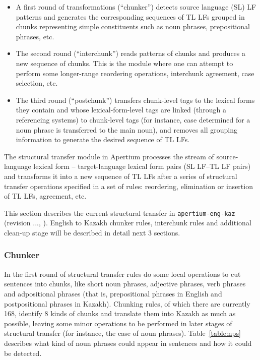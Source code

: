 \documentclass[11pt]{article}
\begin{document}
\begin{itemize}
\item A first round of transformations (``chunker'') detects source language (SL) LF patterns and generates the 
  corresponding sequences of TL LFs grouped in chunks representing simple constituents such as noun phrases, prepositional phrases, etc. 
\item The second round (``interchunk'') reads patterns of chunks and produces a new sequence of chunks. This is the 
  module where one can attempt to perform some longer-range reordering operations, interchunk agreement, case selection, etc. 
\item The third round (``postchunk'') transfers chunk-level tags to the lexical forms they contain and whose lexical-form-level 
  tags are linked (through a referencing systems) to chunk-level tags (for instance, case determined for a noun phrase is 
  transferred to the main noun), and removes all grouping information to generate the desired sequence of TL LFs.
\end{itemize}

The structural transfer module in Apertium processes the stream of source-language lexical form -- target-language lexical 
form pairs (SL LF–TL LF pairs) and transforms it into a new sequence of TL LFs after a series of structural transfer 
operations specified in a set of rules: reordering, elimination or insertion of TL LFs, agreement, etc. 

This section describes the current structural transfer in \texttt{apertium-eng-kaz} (revision ..., ). English to Kazakh 
chunker rules, interchunk rules and additional clean-up stage will be described in detail next 3 sections. 

\subsubsection{Chunker}

In the first round of structural transfer rules do some local operations to cut sentences into chunks, like short noun 
phrases, adjective phrases, verb phrases and adpositional phrases (that is, prepositional phrases in English and 
postpositional phrases in Kazakh).
Chunking rules, of which there are currently 168, identify 8 kinds of chunks and translate them into Kazakh as much 
as possible, leaving some minor operations to be performed in later stages of structural transfer (for instance, the 
case of noun phrases). Table~\ref{table:nps} describes what kind of noun phrases could appear in sentences and how it could be detected.
\end{document}
